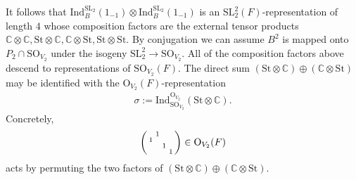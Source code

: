 \documentclass[11pt,a4paper,reqno]{amsart}
\theoremstyle{remark}
\numberwithin{equation}{section}
\newcommand{\SL}{\mathrm{SL}}
\newcommand{\CC}{\mathbb{C}}
\theoremstyle{definition}
\numberwithin{equation}{section}
\newenvironment{psmatrix}
  {\left(\begin{smallmatrix}}
  {\end{smallmatrix}\right)}
\begin{document}
 It follows that $\mathrm{Ind}_{B}^{\SL_2}(1_{-1})\otimes \mathrm{Ind}_{B}^{\SL_2}(1_{-1})$ is an $\SL_2^2(F)$-representation of length $4$ whose composition factors are the external tensor products $\CC\otimes \CC, \mathrm{St}\otimes \CC, \CC\otimes \mathrm{St}, \mathrm{St}\otimes \mathrm{St}$. 
 By conjugation we can assume $B^2$ is mapped onto $P_2\cap \mathrm{SO}_{V_2}$ under the isogeny $\mathrm{SL}_2^2 \to \mathrm{SO}_{V_2}.$  All of the composition factors above descend to representations of  $\mathrm{SO}_{V_2}(F)$.  The direct sum $(\mathrm{St}\otimes \CC) \oplus (\CC\otimes \mathrm{St})$  
may be identified with the $\mathrm{O}_{V_2}(F)$-representation 
\begin{align}
\sigma:=\mathrm{Ind}_{\mathrm{SO}_{V_2}}^{\mathrm{O}_{V_2}}(\mathrm{St} \otimes \CC).
\end{align}
Concretely, 
\begin{align*}
        \begin{psmatrix}
          & 1 & &\\
         1&  &  &\\
         & & 1 & \\
         & &  & 1
        \end{psmatrix}\in \mathrm{O}_{V_2}(F)
    \end{align*}
acts by permuting the two factors of $(\mathrm{St}\otimes \CC) \oplus (\CC\otimes \mathrm{St}).$
\end{document}
